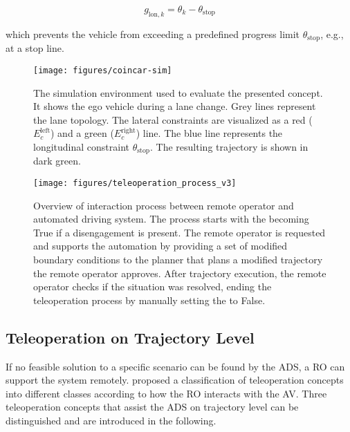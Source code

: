 \begin{equation}
    g_{\text{lon},k} = \theta_k - \theta_\text{stop}
\end{equation}

which prevents the vehicle from exceeding a predefined progress limit $\theta_\text{stop}$, e.g., at a stop line.

\begin{figure}[!h]
    \centering
    \texttt{[image: figures/coincar-sim]}
    \caption{
        The simulation environment used to evaluate the presented concept.
        It shows the ego vehicle during a lane change.
        Grey lines represent the lane topology.
        The lateral constraints are visualized as a red ($E_c^\text{left}$) and a green ($E_c^\text{right}$) line.
        The blue line represents the longitudinal constraint $\theta_\text{stop}$.
        The resulting trajectory is shown in dark green.
    }
    \label{fig:simulation}
\end{figure}

\begin{figure*}[!b]
    \centering
    \texttt{[image: figures/teleoperation\_process\_v3]}
    \caption{Overview of interaction process between remote operator and automated driving system. The process starts with the  becoming True if a disengagement is present. The remote operator is requested and supports the automation by providing a set of modified boundary conditions to the planner that plans a modified trajectory the remote operator approves. After trajectory execution, the remote operator checks if the situation was resolved, ending the teleoperation process by manually setting the  to False.}   
    \label{fig:teleoperation_process}
\end{figure*}


\subsection{Teleoperation on Trajectory Level}
\label{sec:teleoperation-sota}
If no feasible solution to a specific scenario can be found by the \gls{ADS}, a \gls{RO} can support the system remotely.
\textcite{Maj2022bSurveyTeleoperationConcepts} proposed a classification of teleoperation concepts into different classes according to how the \gls{RO} interacts with the \gls{AV}.  
Three teleoperation concepts that assist the \gls{ADS} on trajectory level can be distinguished and are introduced in the following.


